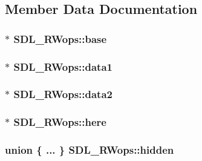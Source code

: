 \subsection{Member Data Documentation}
\hypertarget{struct_s_d_l___r_wops_af9b489d7342296ce197b911cfa93b2ab}{
\subsubsection[{base}]{$\ast$ S\-D\-L\-\_\-\-R\-Wops\-::base}}\label{struct_s_d_l___r_wops_af9b489d7342296ce197b911cfa93b2ab}
\hypertarget{struct_s_d_l___r_wops_ab89d27b4312c0b9d664c81bc92917fc8}{
\subsubsection[{data1}]{$\ast$ S\-D\-L\-\_\-\-R\-Wops\-::data1}}\label{struct_s_d_l___r_wops_ab89d27b4312c0b9d664c81bc92917fc8}
\hypertarget{struct_s_d_l___r_wops_aca073130e2e262eb11e86e1be993e215}{
\subsubsection[{data2}]{$\ast$ S\-D\-L\-\_\-\-R\-Wops\-::data2}}\label{struct_s_d_l___r_wops_aca073130e2e262eb11e86e1be993e215}
\hypertarget{struct_s_d_l___r_wops_a6fc84601c17e347c6ef24c63a79deb57}{
\subsubsection[{here}]{$\ast$ S\-D\-L\-\_\-\-R\-Wops\-::here}}\label{struct_s_d_l___r_wops_a6fc84601c17e347c6ef24c63a79deb57}
\hypertarget{struct_s_d_l___r_wops_a2bf0dec0395f771b30c841fc7296164b}{
\subsubsection[{hidden}]{\setlength{\rightskip}{0pt plus 5cm}union \{ ... \}   S\-D\-L\-\_\-\-R\-Wops\-::hidden}}\label{struct_s_d_l___r_wops_a2bf0dec0395f771b30c841fc7296164b}
